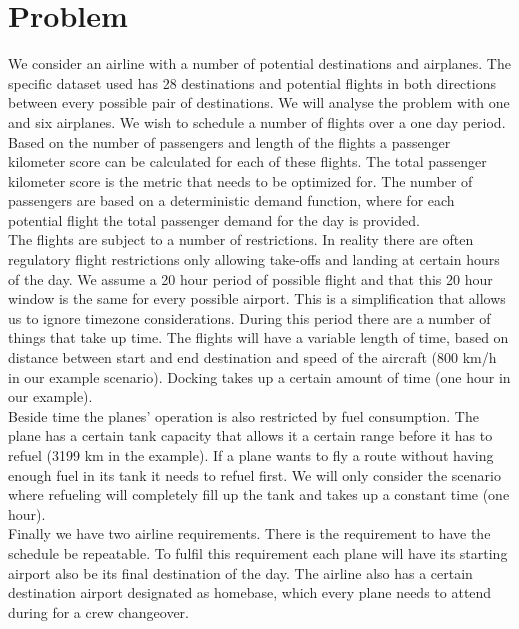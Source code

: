 \documentclass[journal]{IEEEtran}
\begin{document}
\section{Problem}
We consider an airline with a number of potential destinations and airplanes. The specific dataset used has 28 destinations and potential flights in both directions between every possible pair of destinations. We will analyse the problem with one and six airplanes. We wish to schedule a number of flights over a one day period. Based on the number of passengers and length of the flights a passenger kilometer score can be calculated for each of these flights. The total passenger kilometer score is the metric that needs to be optimized for. The number of passengers are based on a deterministic demand function, where for each potential flight the total passenger demand for the day is provided. \\
The flights are subject to a number of restrictions. In reality there are often regulatory flight restrictions only allowing take-offs and landing at certain hours of the day. We assume a 20 hour period of possible flight and that this 20 hour window is the same for every possible airport. This is a simplification that allows us to ignore timezone considerations. During this period there are a number of things that take up time. The flights will have a variable length of time, based on distance between start and end destination and speed of the aircraft (800 km/h in our example scenario). Docking takes up a certain amount of time (one hour in our example).\\
Beside time the planes' operation is also restricted by fuel consumption. The plane has a certain tank capacity that allows it a certain range before it has to refuel (3199 km in the example). If a plane wants to fly a route without having enough fuel in its tank it needs to refuel first. We will only consider the scenario where refueling will completely fill up the tank and takes up a constant time (one hour). \\
Finally we have two airline requirements. There is the requirement to have the schedule be repeatable. To fulfil this requirement each plane will have its starting airport also be its final destination of the day. The airline also has a certain destination airport designated as homebase, which every plane needs to attend during for a crew changeover. 
\end{document}

